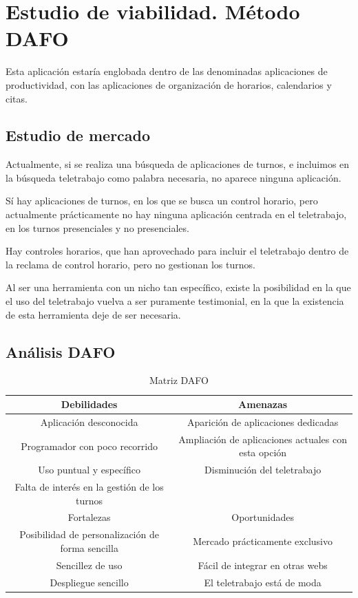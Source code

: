 \documentclass[11pt,spanish,listoffigures,listoftables]{tfgetsinf}
\begin{document}
\chapter{Estudio de viabilidad. Método DAFO}

Esta aplicación estaría englobada dentro de las denominadas aplicaciones de productividad, con las aplicaciones de organización de horarios, calendarios y citas.

\section{Estudio de mercado}

Actualmente, si se realiza una búsqueda de aplicaciones de turnos, e incluimos en la búsqueda teletrabajo como palabra necesaria, no aparece ninguna aplicación. 

Sí hay aplicaciones de turnos, en los que se busca un control horario, pero actualmente prácticamente no hay ninguna aplicación centrada en el teletrabajo, en los turnos presenciales y no presenciales.

Hay controles horarios, que han aprovechado para incluir el teletrabajo dentro de la reclama de control horario, pero no gestionan los turnos.

Al ser una herramienta con un nicho tan específico, existe la posibilidad en la que el uso del teletrabajo vuelva a ser puramente testimonial, en la que la existencia de esta herramienta deje de ser necesaria.
\section{Análisis DAFO}
\begin{table} 
\begin{center}
\begin{tabular}{| c | c |}
\hline
Debilidades & Amenazas \\ \hline
\tiny Aplicación desconocida & \tiny Aparición de aplicaciones dedicadas \\
\tiny Programador con poco recorrido & \tiny Ampliación de aplicaciones actuales con esta opción \\
\tiny Uso puntual y específico & \tiny Disminución del teletrabajo\\
\tiny Falta de interés en la gestión de los turnos &  \\ \hline   
\normalsize
Fortalezas & Oportunidades \\ \hline
\tiny Posibilidad de personalización de forma sencilla & \tiny Mercado prácticamente exclusivo \\
\tiny Sencillez de uso &  \tiny Fácil de integrar en otras webs\\
\tiny Despliegue sencillo & \tiny El teletrabajo está de moda \\
\hline
\end{tabular}
\caption{Matriz DAFO}
\label{table:1}
\end{center}
\end{table}
\end{document}
